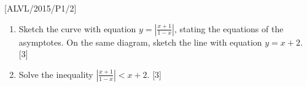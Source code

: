 \item {[}ALVL/2015/P1/2{]}
\begin{enumerate}
\item Sketch the curve with equation $y=\left|\frac{x+1}{1-x}\right|$,
stating the equations of the asymptotes. On the same diagram, sketch
the line with equation $y=x+2$. \hfill{}{[}3{]}
\item Solve the inequality $\left|\frac{x+1}{1-x}\right|<x+2$. \hfill{}{[}3{]}
\end{enumerate}
